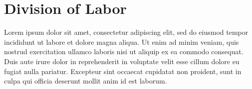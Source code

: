 \documentclass[11pt,a4paper]{article}
\begin{document}
\section{Division of Labor}
Lorem ipsum dolor sit amet, consectetur adipiscing elit, sed do eiusmod tempor incididunt ut labore et dolore magna aliqua. Ut enim ad minim veniam, quis nostrud exercitation ullamco laboris nisi ut aliquip ex ea commodo consequat. Duis aute irure dolor in reprehenderit in voluptate velit esse cillum dolore eu fugiat nulla pariatur. Excepteur sint occaecat cupidatat non proident, sunt in culpa qui officia deserunt mollit anim id est laborum.







\end{document}
